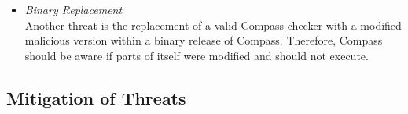 \begin{itemize}
\item \emph{Binary Replacement} \\ Another threat is the replacement of a valid Compass
    checker with a modified malicious version within a binary release of Compass.
    Therefore, Compass should be aware if parts of itself were modified and should not
    execute.

\end{itemize} 

\subsection{Mitigation of Threats}

